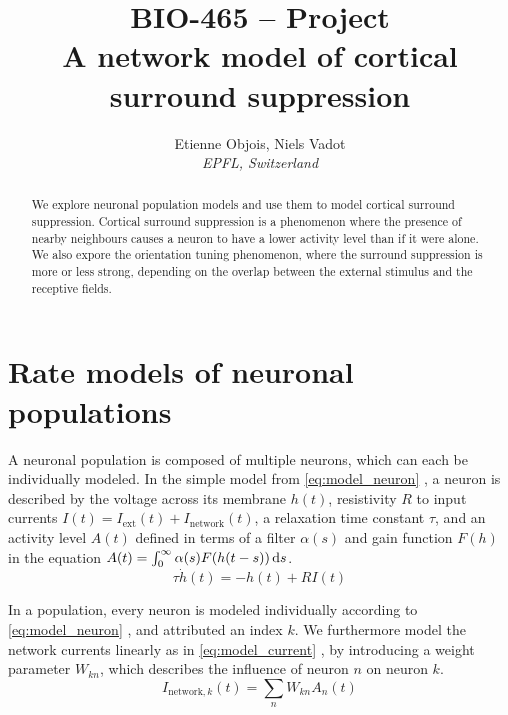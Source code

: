 \documentclass[10pt,conference,compsocconf,a4paper]{IEEEtran}
\newcommand*{\shortautoref}[1]{%
	\begingroup
	\def\equationautorefname{\textsc{Eq.}}%
	\def\tableautorefname{\textsc{Tab.}}%
	\def\figureautorefname{\textsc{Fig.}}%
	\autoref{#1}%
	\endgroup
}
\begin{document}
\title{BIO-465 -- Project\\A network model of cortical surround suppression}

\author{
	Etienne Objois, Niels Vadot\\
	\textit{EPFL, Switzerland}
}

\maketitle

\begin{abstract}
	We explore neuronal population models and use them to model cortical surround suppression.
	Cortical surround suppression is a phenomenon where the presence of nearby neighbours causes a neuron to have a lower activity level than if it were alone.
	We also expore the orientation tuning phenomenon, where the surround suppression is more or less strong, depending on the overlap between the external stimulus and the receptive fields.
\end{abstract}

\section{Rate models of neuronal populations}

	A neuronal population is composed of multiple neurons, which can each be individually modeled. In the simple model from \shortautoref{eq:model_neuron}, a neuron is described by the voltage across its membrane $h(t)$, resistivity $R$ to input currents $I(t) = I_{\text{ext}}(t) + I_{\text{network}}(t)$, a relaxation time constant $\tau$, and an activity level $A(t)$ defined in terms of a filter $\alpha(s)$ and gain function $F(h)$ in the equation $A(t) = \int_0^\infty \alpha(s) F(h(t-s)) \dif{s}$.
\
	\begin{equation} \label{eq:model_neuron}
		\tau \dot h(t) = -h(t) + R I(t)
	\end{equation}

	In a population, every neuron is modeled individually according to \shortautoref{eq:model_neuron}, and attributed an index $k$. We furthermore model the network currents linearly as in \shortautoref{eq:model_current}, by introducing a weight parameter $W_{kn}$, which describes the influence of neuron $n$ on neuron $k$.
\
	\begin{equation} \label{eq:model_current}
		I_{\text{network},k}(t) = \sum_n W_{kn} A_n(t)
	\end{equation}
\end{document}
